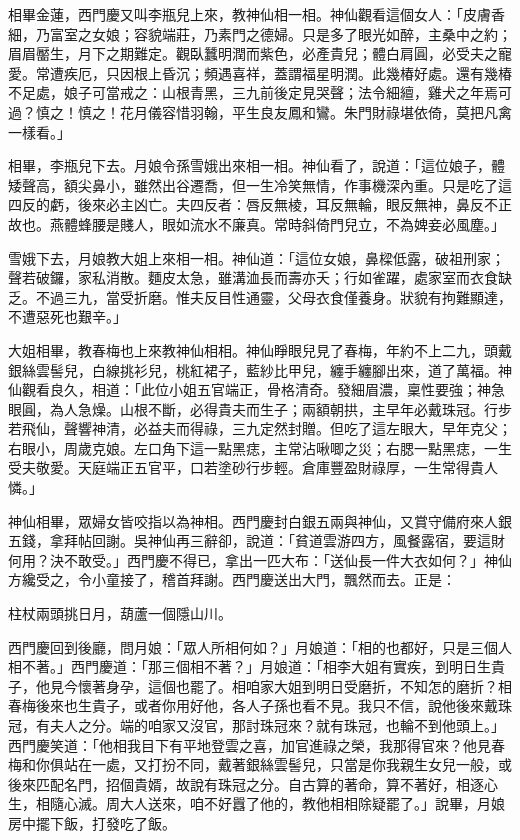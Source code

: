 \begin{showcontents}{}
相畢金蓮，西門慶又叫李瓶兒上來，教神仙相一相。神仙觀看這個女人：「皮膚香細，乃富室之女娘；容貌端莊，乃素門之德婦。只是多了眼光如醉，主桑中之約；眉眉靨生，月下之期難定。觀臥蠶明潤而紫色，必產貴兒；體白肩圓，必受夫之寵愛。常遭疾厄，只因根上昏沉；頻遇喜祥，蓋謂福星明潤。此幾椿好處。還有幾椿不足處，娘子可當戒之：山根青黑，三九前後定見哭聲；法令細繵，雞犬之年焉可過？慎之！慎之！花月儀容惜羽翰，平生良友鳳和鸞。朱門財祿堪依倚，莫把凡禽一樣看。」

相畢，李瓶兒下去。月娘令孫雪娥出來相一相。神仙看了，說道：「這位娘子，體矮聲高，額尖鼻小，雖然出谷遷喬，但一生冷笑無情，作事機深內重。只是吃了這四反的虧，後來必主凶亡。夫四反者：唇反無棱，耳反無輪，眼反無神，鼻反不正故也。燕體蜂腰是賤人，眼如流水不廉真。常時斜倚門兒立，不為婢妾必風塵。」

雪娥下去，月娘教大姐上來相一相。神仙道：「這位女娘，鼻樑低露，破祖刑家；聲若破鑼，家私消散。麵皮太急，雖溝洫長而壽亦夭；行如雀躍，處家室而衣食缺乏。不過三九，當受折磨。惟夫反目性通靈，父母衣食僅養身。狀貌有拘難顯達，不遭惡死也艱辛。」

大姐相畢，教春梅也上來教神仙相相。神仙睜眼兒見了春梅，年約不上二九，頭戴銀絲雲髻兒，白線挑衫兒，桃紅裙子，藍紗比甲兒，纏手纏腳出來，道了萬福。神仙觀看良久，相道：「此位小姐五官端正，骨格清奇。發細眉濃，稟性要強；神急眼圓，為人急燥。山根不斷，必得貴夫而生子；兩額朝拱，主早年必戴珠冠。行步若飛仙，聲響神清，必益夫而得祿，三九定然封贈。但吃了這左眼大，早年克父；右眼小，周歲克娘。左口角下這一點黑痣，主常沾啾唧之災；右腮一點黑痣，一生受夫敬愛。天庭端正五官平，口若塗砂行步輕。倉庫豐盈財祿厚，一生常得貴人憐。」

神仙相畢，眾婦女皆咬指以為神相。西門慶封白銀五兩與神仙，又賞守備府來人銀五錢，拿拜帖回謝。吳神仙再三辭卻，說道：「貧道雲游四方，風餐露宿，要這財何用？決不敢受。」西門慶不得已，拿出一匹大布：「送仙長一件大衣如何？」神仙方纔受之，令小童接了，稽首拜謝。西門慶送出大門，飄然而去。正是：

柱杖兩頭挑日月，葫蘆一個隱山川。

西門慶回到後廳，問月娘：「眾人所相何如？」月娘道：「相的也都好，只是三個人相不著。」西門慶道：「那三個相不著？」月娘道：「相李大姐有實疾，到明日生貴子，他見今懷著身孕，這個也罷了。相咱家大姐到明日受磨折，不知怎的磨折？相春梅後來也生貴子，或者你用好他，各人子孫也看不見。我只不信，說他後來戴珠冠，有夫人之分。端的咱家又沒官，那討珠冠來？就有珠冠，也輪不到他頭上。」西門慶笑道：「他相我目下有平地登雲之喜，加官進祿之榮，我那得官來？他見春梅和你俱站在一處，又打扮不同，戴著銀絲雲髻兒，只當是你我親生女兒一般，或後來匹配名門，招個貴婿，故說有珠冠之分。自古算的著命，算不著好，相逐心生，相隨心滅。周大人送來，咱不好囂了他的，教他相相除疑罷了。」說畢，月娘房中擺下飯，打發吃了飯。


\end{showcontents}
